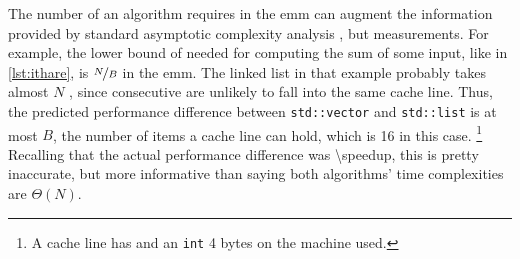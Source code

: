 

The number of  an algorithm requires in the \gls{emm} can augment the
information provided by standard asymptotic complexity analysis%
,
but  measurements.
For example, the lower bound of  needed for computing the sum of some
input, like in \cref{lst:ithare}, is \(\nicefrac{N}{B}\) in the \gls{emm}.  The
linked list in that example probably takes almost \(N\) , since
consecutive  are unlikely to fall into the same cache line.  Thus,
the predicted performance difference between \texttt{std::vector} and
\texttt{std::list} is at most \(B\), the number of items a cache line can hold,
which is \si{16} in this case.%
\footnote{%
  A cache line has  and an \texttt{int} \si{4}
  bytes on the machine used.
}
Recalling that the actual performance difference was \num[round-mode=places,
round-precision=0]{\speedup}, this is pretty inaccurate, but more informative than saying
both algorithms' time complexities are  \(\Theta(N)\).




